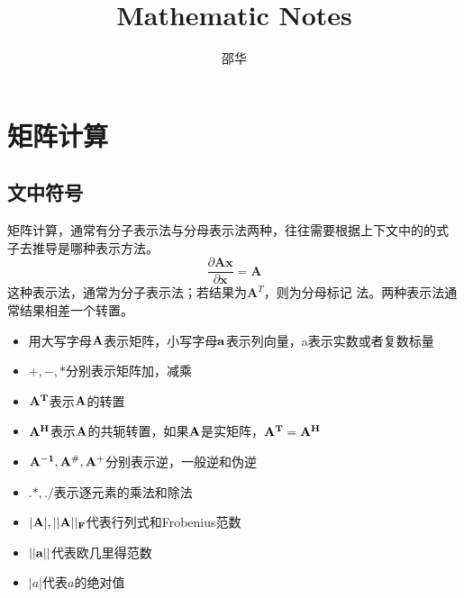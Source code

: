 \documentclass[fontset=none,oneside]{book}
\begin{document}
\title{Mathematic Notes}
\author{邵华}
\maketitle
\tableofcontents
\chapter{矩阵计算}
\section{文中符号}
矩阵计算，通常有分子表示法与分母表示法两种，往往需要根据上下文中的的式
子去推导是哪种表示方法。
\begin{equation}
\label{eq:45}
\frac{\partial \mathbf{Ax}}{\partial \mathbf{x}}=\mathbf{A}
\end{equation}
  这种表示法，通常为分子表示法；若结果为$\mathbf{A}^{T}$，则为分母标记
  法。两种表示法通常结果相差一个转置。\par
\begin{itemize}
\item 用大写字母$\bf A$表示矩阵，小写字母$\bf a$表示列向量，a表示实数或者复数标量
\item $+,-,*$分别表示矩阵加，减乘
\item $\bf A^T$表示$\bf A$的转置
\item $\bf A^H$表示$\bf A$的共轭转置，如果$\bf A$是实矩阵，$\bf A^T=\bf A^H$
\item $\bf A^{-1},A^{\#},A^{+}$分别表示逆，一般逆和伪逆
\item $.*,./$表示逐元素的乘法和除法
\item $|\bf A|,||\bf A||_F$代表行列式和Frobenius范数
\item $||\bf a||$代表欧几里得范数
\item $|a|$代表$a$的绝对值
\end{itemize}
\end{document}
